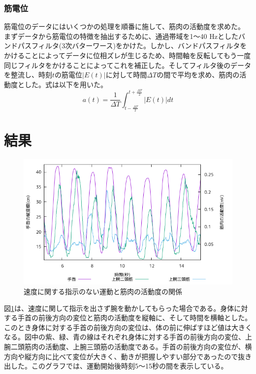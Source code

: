 \documentclass{jsarticle}
\begin{document}
\subsubsection{筋電位}
筋電位のデータにはいくつかの処理を順番に施して、筋肉の活動度を求めた。
  まずデータから筋電位の特徴を抽出するために、通過帯域を1〜40 Hzとしたバンドパスフィルタ(3次バターワース)をかけた。しかし、バンドパスフィルタをかけることによってデータに位相ズレが生じるため、時間軸を反転してもう一度同じフィルタをかけることによってこれを補正した。そしてフィルタ後のデータを整流し、時刻$t$の筋電位$|E(t)|$に対して時間$\Delta T$の間で平均を求め、筋肉の活動度とした。式は以下を用いた。
  \begin{equation}
    a(t) = \frac{1}{\Delta T} \int_{t-\frac{\Delta T}{2}}^{t+\frac{\Delta T}{2}} |E(t)| dt
  \end{equation}

\section{結果}
\begin{figure}[b]
  \begin{center}
    \includegraphics[width=15cm]{images/s1proto.png}
  \end{center}
  \caption{速度に関する指示のない運動と筋肉の活動度の関係}
  \label{fig:slow}
\end{figure}
図\ref{fig:slow}は、速度に関して指示を出さず腕を動かしてもらった場合である。身体に対する手首の前後方向の変位と筋肉の活動度を縦軸に、そして時間を横軸とした。このとき身体に対する手首の前後方向の変位は、体の前に伸ばすほど値は大きくなる。図中の紫、緑、青の線はそれぞれ身体に対する手首の前後方向の変位、上腕二頭筋肉の活動度、上腕三頭筋の活動度である。手首の前後方向の変位が、横方向や縦方向に比べて変位が大きく、動きが把握しやすい部分であったので抜き出した。このグラフでは、運動開始後時刻5〜15秒の間を表示している。
\end{document}
